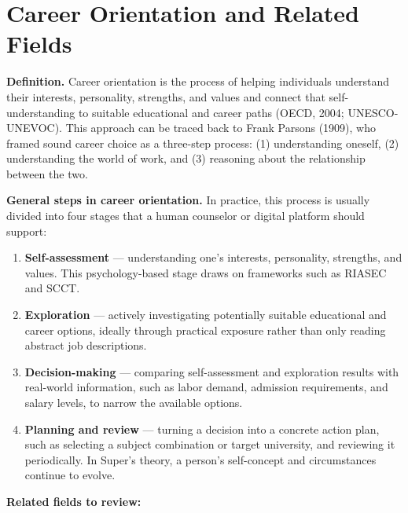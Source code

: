 \documentclass[a4paper]{article}
\begin{document}
\section{Career Orientation and Related Fields}

\textbf{Definition.} Career orientation is the process of helping individuals understand their interests, personality, strengths, and values and connect that self-understanding to suitable educational and career paths (OECD, 2004; UNESCO-UNEVOC). This approach can be traced back to Frank Parsons (1909), who framed sound career choice as a three-step process: (1) understanding oneself, (2) understanding the world of work, and (3) reasoning about the relationship between the two.

\textbf{General steps in career orientation.} In practice, this process is usually divided into four stages that a human counselor or digital platform should support:
\begin{enumerate}
    \item \textbf{Self-assessment} — understanding one's interests, personality, strengths, and values. This psychology-based stage draws on frameworks such as RIASEC and SCCT.
    \item \textbf{Exploration} — actively investigating potentially suitable educational and career options, ideally through practical exposure rather than only reading abstract job descriptions.
    \item \textbf{Decision-making} — comparing self-assessment and exploration results with real-world information, such as labor demand, admission requirements, and salary levels, to narrow the available options.
    \item \textbf{Planning and review} — turning a decision into a concrete action plan, such as selecting a subject combination or target university, and reviewing it periodically. In Super's theory, a person's self-concept and circumstances continue to evolve.
\end{enumerate}

\textbf{Related fields to review:}
\end{document}

